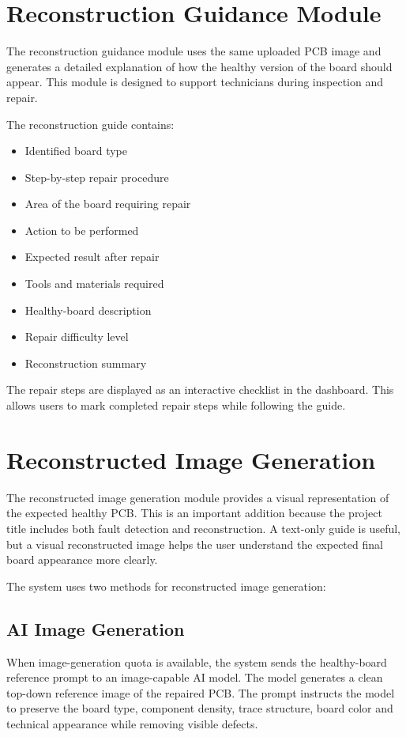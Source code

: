 \documentclass[12pt,a4paper]{report}
\begin{document}
\chapter{Reconstruction Guidance Module}

The reconstruction guidance module uses the same uploaded PCB image and generates a detailed explanation of how the healthy version of the board should appear. This module is designed to support technicians during inspection and repair.

The reconstruction guide contains:

\begin{itemize}
    \item Identified board type
    \item Step-by-step repair procedure
    \item Area of the board requiring repair
    \item Action to be performed
    \item Expected result after repair
    \item Tools and materials required
    \item Healthy-board description
    \item Repair difficulty level
    \item Reconstruction summary
\end{itemize}

The repair steps are displayed as an interactive checklist in the dashboard. This allows users to mark completed repair steps while following the guide.

\chapter{Reconstructed Image Generation}

The reconstructed image generation module provides a visual representation of the expected healthy PCB. This is an important addition because the project title includes both fault detection and reconstruction. A text-only guide is useful, but a visual reconstructed image helps the user understand the expected final board appearance more clearly.

The system uses two methods for reconstructed image generation:

\section{AI Image Generation}

When image-generation quota is available, the system sends the healthy-board reference prompt to an image-capable AI model. The model generates a clean top-down reference image of the repaired PCB. The prompt instructs the model to preserve the board type, component density, trace structure, board color and technical appearance while removing visible defects.
\end{document}
